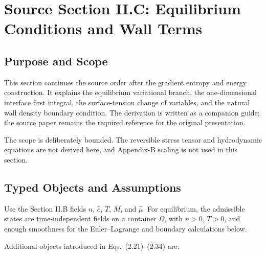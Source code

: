 \section{Source Section II.C: Equilibrium Conditions and Wall Terms}
\label{sec:equilibrium-conditions}


\subsection{Purpose and Scope}

This section continues the source order after the gradient entropy and energy
construction.  It explains the equilibrium variational branch, the
one-dimensional interface first integral, the surface-tension change of
variables, and the natural wall density boundary condition.  The derivation is
written as a companion guide; the source paper remains the required reference
for the original presentation.

The scope is deliberately bounded.  The reversible stress tensor and
hydrodynamic equations are not derived here, and Appendix-B scaling is not used
in this section.

\subsection{Typed Objects and Assumptions}

Use the Section II.B fields \(n\), \(\hat e\), \(T\), \(M\), and \(\hat\mu\).
For equilibrium, the admissible states are time-independent fields on a
container \(\Omega\), with \(n>0\), \(T>0\), and enough smoothness for the
Euler--Lagrange and boundary calculations below.

Additional objects introduced in Eqs.~(2.21)--(2.34) are:


